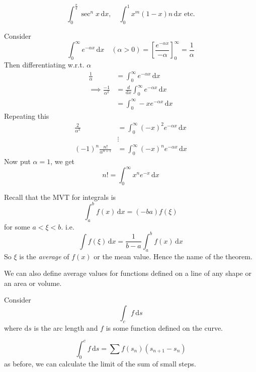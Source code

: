 \documentclass[10pt]{scrartcl}
\begin{document}
\begin{example} 
\[
  \int_0^{\frac{\pi}{4}} \sec^nx\,\mathrm{d}x,\quad \int_0^{1}x^m(1-x)n\,\mathrm{d}x \text{ etc.} 
\]

Consider 
\[
  \int_0^\infty e^{-\alpha x}\,\mathrm{d}x \quad (\alpha >0) = \left[\frac{e^{-\alpha x}}{-\alpha}\right]^\infty_0 = \frac{1}{\alpha}
\]
Then differentiating w.r.t. $\alpha$
\begin{align*}
  \frac{1}{\alpha} &= \int_0^\infty e^{-\alpha x}\,\mathrm{d}x \\
  \implies \frac{-1}{\alpha^2} &= \frac{d}{\mathrm{d}x}\int_0^\infty e^{-\alpha x}\,\mathrm{d}x \\
  &= \int_0^\infty -xe^{-\alpha x}\,\mathrm{d}x 
\end{align*}
Repeating this 
\begin{align*}
  \frac{2}{\alpha^3} &= \int_0^\infty (-x)^2e^{-\alpha x}\,\mathrm{d}x \\
  &\vdots\\
  (-1)^n \frac{n!}{\alpha^{n+1}} &= \int_0^\infty (-x)^ne^{-\alpha x}\,\mathrm{d}x 
\end{align*}
Now put $\alpha = 1$, we get
\[
  \boxed{n! = \int_0^\infty x^ne^{-x}\,\mathrm{d}x}
\]
\end{example}

Recall that the MVT for integrals is
\[
  \int_a^b f(x)\,\mathrm{d}x = (-ba)f(\xi)
\]
for some $a < \xi < b$. i.e. 
\[
  \int f(\xi)\,\mathrm{d}x = \frac{1}{b-a} \int_a^b f(x)\,\mathrm{d}x
\]
So $\xi$ is the \emph{average} of $f(x)$ or the mean value. Hence the name of the theorem.

We can also define average values for functions defined on a line of any shape or an area or volume. 


Consider 
\[
  \int_c f\,\mathrm{d}s
\]
where $\mathrm{d}s$ is the arc length and $f$ is some function defined on the curve.
\begin{center}
\end{center}
\[
  \int_0^c f\,\mathrm{d}s =  \sum f(s_n)(s_{n+1}-s_n)
\]
as before, we can calculate the limit of the sum of small steps. 
\end{document}
